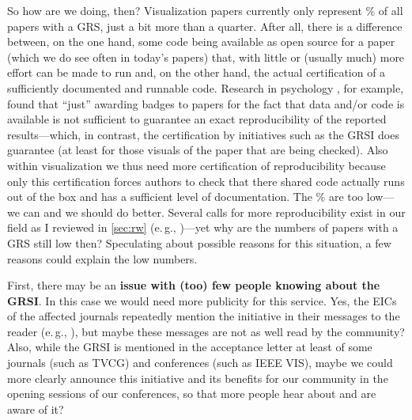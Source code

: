 \documentclass[conference]{vgtc}                     %
\newcommand{\eg}{e.\,g.}
\begin{document}
So how are we doing, then? Visualization papers currently only represent \GrsiPercentageVisPapers{}\% of all papers with a GRS, just a bit more than a quarter. After all, there is a difference between, on the one hand, some code being available as open source for a paper (which we do see often in today's papers) that, with little or (usually much) more effort \cite{Bonneel:2020:CRC} can be made to run and, on the other hand, the actual certification of a sufficiently documented and runnable code. Research in psychology \cite{Crumwell:2023:WBC}, for example, found that ``just'' awarding badges to papers for the fact that data and/or code is available is not sufficient to guarantee an exact reproducibility of the reported results---which, in contrast, the certification by initiatives such as the GRSI does guarantee (at least for those visuals of the paper that are being checked). Also within visualization we thus need more certification of reproducibility because only this certification forces authors to check that there shared code actually runs out of the box and has a sufficient level of documentation. The \GrsiPercentageVisPapers{}\% are too low---we can and we should do better. Several calls for more reproducibility exist in our field as I reviewed in \autoref{sec:rw} (\eg, \cite{Fekete:2020:ERV,Haroz:2018:OPV,Kosara:2016:EBS})---yet why are the numbers of papers with a GRS still low then? Speculating about possible reasons for this situation, a few reasons could explain the low numbers.

First, there may be an \textbf{issue with (too) few people knowing about the GRSI}. In this case we would need more publicity for this service. Yes, the EICs of the affected journals repeatedly mention the initiative in their messages to the reader (\eg, \cite{DeFloriani:2018:MEC,Jorge:2018:EN}), but maybe these messages are not as well read by the community? Also, while the GRSI is mentioned in the acceptance letter at least of some journals (such as TVCG) and conferences (such as IEEE VIS), maybe we could more clearly announce this initiative and its benefits for our community in the opening sessions of our conferences, so that more people hear about and are aware of it?
\end{document}
